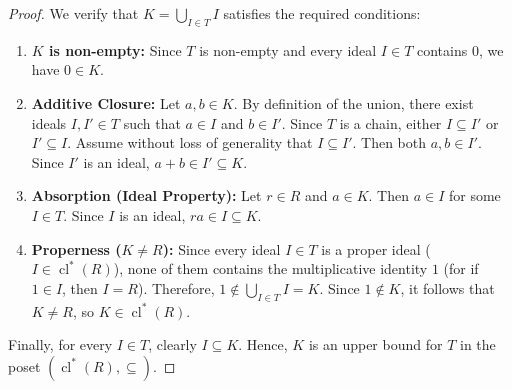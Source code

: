 \begin{content}

\begin{proof}
We verify that $K = \bigcup_{I \in T} I$ satisfies the required conditions:
\begin{enumerate}[label=\textbf{(\arabic*)}]
    \setcounter{enumi}{0} \item \textbf{$K$ is non-empty:} Since $T$ is non-empty and every ideal $I \in T$ contains $0$, we have $0 \in K$.
    \item \textbf{Additive Closure:} Let $a, b \in K$. By definition of the union, there exist ideals $I, I' \in T$ such that $a \in I$ and $b \in I'$. Since $T$ is a chain, either $I \subseteq I'$ or $I' \subseteq I$. Assume without loss of generality that $I \subseteq I'$. Then both $a, b \in I'$. Since $I'$ is an ideal, $a + b \in I' \subseteq K$.
    \item \textbf{Absorption (Ideal Property):} Let $r \in R$ and $a \in K$. Then $a \in I$ for some $I \in T$. Since $I$ is an ideal, $ra \in I \subseteq K$.
    \item \textbf{Properness ($K \neq R$):} Since every ideal $I \in T$ is a proper ideal ($I \in \operatorname{cl}^*(R)$), none of them contains the multiplicative identity $1$ (for if $1 \in I$, then $I = R$). Therefore, $1 \notin \bigcup_{I \in T} I = K$. Since $1 \notin K$, it follows that $K \neq R$, so $K \in \operatorname{cl}^*(R)$.
\end{enumerate}
Finally, for every $I \in T$, clearly $I \subseteq K$. Hence, $K$ is an upper bound for $T$ in the poset $(\operatorname{cl}^*(R), \subseteq)$.
\end{proof}



\end{content}
